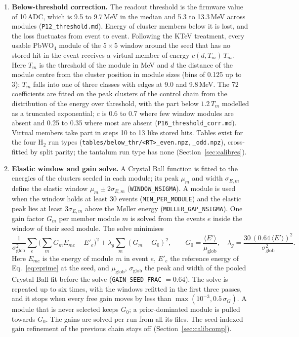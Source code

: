 \documentclass[11pt]{article}
\newcommand{\code}[1]{\texttt{#1}}
\begin{document}
\begin{enumerate}
\item \textbf{Below-threshold correction.} The readout threshold is the firmware value of 10\,ADC, which is 9.5 to 9.7\,MeV in the median and 5.3 to 13.3\,MeV across modules (\code{P12\_threshold.md}). Energy of cluster members below it is lost, and the loss fluctuates from event to event. Following the KTeV treatment, every usable PbWO$_4$ module of the $5 \times 5$ window around the seed that has no stored hit in the event receives a virtual member of energy $c(d, T_m)\, T_m$. Here $T_m$ is the threshold of the module in MeV and $d$ the distance of the module centre from the cluster position in module sizes (bins of 0.125 up to 3); $T_m$ falls into one of three classes with edges at 9.0 and 9.8\,MeV. The 72 coefficients are fitted on the peak clusters of the control chain from the distribution of the energy over threshold, with the part below $1.2\,T_m$ modelled as a truncated exponential; $c$ is 0.6 to 0.7 where few window modules are absent and 0.25 to 0.35 where most are absent (\code{P16\_threshold\_corr.md}). Virtual members take part in steps 10 to 13 like stored hits. Tables exist for the four H$_2$ run types (\code{tables/below\_thr/<RT>\_even.npz}, \code{\_odd.npz}), cross-fitted by split parity; the tantalum run type has none (Section~\ref{sec:calibres}).
\item \textbf{Elastic window and gain solve.} A Crystal Ball function is fitted to the energies of the clusters seeded in each module; its peak $\mu_m$ and width $\sigma_{E,m}$ define the elastic window $\mu_m \pm 2\sigma_{E,m}$ (\code{WINDOW\_NSIGMA}). A module is used when the window holds at least 30 events (\code{MIN\_PER\_MODULE}) and the elastic peak lies at least $3\sigma_{E,m}$ above the M{\o}ller energy (\code{MOLLER\_GAP\_NSIGMA}). One gain factor $G_m$ per member module $m$ is solved from the events $e$ inside the window of their seed module. The solve minimises
\begin{equation}
\frac{1}{\sigma_{\mathrm{glob}}^2} \sum_{e} \Big( \sum_m G_m E_{me} - E'_e \Big)^2 + \lambda_g \sum_m (G_m - G_0)^2,
\qquad
G_0 = \frac{\langle E' \rangle}{\mu_{\mathrm{glob}}},\quad
\lambda_g = \frac{30\, (0.64\, \langle E' \rangle)^2}{\sigma_{\mathrm{glob}}^2} .
\label{eq:gainsolve}
\end{equation}
Here $E_{me}$ is the energy of module $m$ in event $e$, $E'_e$ the reference energy of Eq.~\eqref{eq:eprime} at the seed, and $\mu_{\mathrm{glob}}$, $\sigma_{\mathrm{glob}}$ the peak and width of the pooled Crystal Ball fit before the solve (\code{GAIN\_SEED\_FRAC} $= 0.64$). The solve is repeated up to six times, with the windows refitted in the first three passes, and it stops when every free gain moves by less than $\max(10^{-3}, 0.5\,\sigma_{G})$. A module that is never selected keeps $G_0$; a prior-dominated module is pulled towards $G_0$. The gains are solved per run from all its files. The seed-indexed gain refinement of the previous chain stays off (Section~\ref{sec:calibcomp}).

\end{enumerate}
\end{document}
